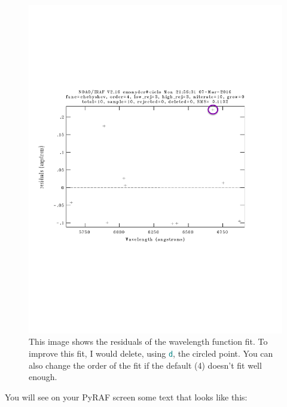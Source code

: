 \documentclass[12pt]{report}
\newcommand{\ty}[1]{\textcolor{teal}{\texttt{#1}}}
\begin{document}
\begin{figure}[h]
\centering
\includegraphics[scale=0.6]{wave_red_bad_new}
\caption[Example of the residuals of the wavelength fit]{This image shows the residuals of the wavelength function fit.  To improve this fit, I would delete, using \ty{d}, the circled point. You can also change the order of the fit if the default (4) doesn't fit well enough.}
\label{fig:resids}
\end{figure}

You will see on your PyRAF screen some text that looks like this:
\end{document}

